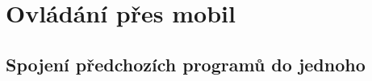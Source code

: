 \chapter{Ovládání přes mobil}

\section{Spojení předchozích programů do jednoho}

\section{}

\section{}

\section{}






\newpage